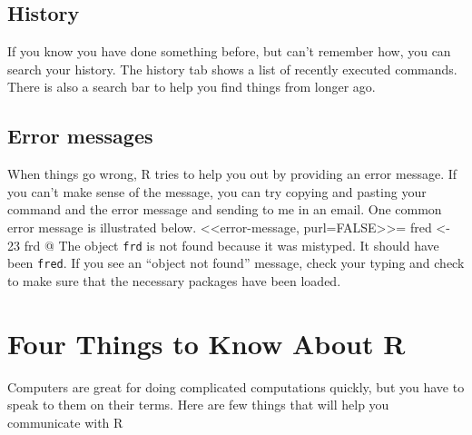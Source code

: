 \documentclass[]{book}
\begin{document}
\hypertarget{history}{%
\subsection{History}\label{history}}

If you know you have done something before, but can't remember how, you can search your history. The history tab shows a list of recently executed commands. There is also a search bar to help you find things from longer ago.

\hypertarget{error-messages}{%
\subsection{Error messages}\label{error-messages}}

When things go wrong, R tries to help you out by providing an error message. If you can't make sense of the message, you can try copying and pasting your command and the error message and sending to me in an email. One common error message is illustrated below.
\textless\textless error-message, purl=FALSE\textgreater\textgreater=
fred \textless- 23
frd
@
The object \texttt{frd} is not found because it was mistyped. It should have been \texttt{fred}. If you see an ``object not found'' message, check your typing and check to make sure that the necessary packages have been loaded.

\hypertarget{four-things-to-know-about-r}{%
\section{Four Things to Know About R}\label{four-things-to-know-about-r}}

Computers are great for doing complicated computations quickly, but you have to speak to them on their terms. Here are few things that will help you communicate with R
\end{document}
